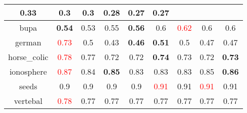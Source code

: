 \documentclass{article}%
\begin{document}
\begin{tabular}{c|cccccccc}
{0.33
}&0.3&\textbf{0.3}&0.28&0.27&0.27\\%
\hline%
bupa&\textbf{0.54}&0.53&0.55&\textbf{0.56}&0.6&\textcolor{red}{ 
0.62
}&0.6&0.6\\%
\hline%
german&\textcolor{red}{ 
0.73
}&0.5&0.43&\textbf{0.46}&\textbf{0.51}&0.5&0.47&0.47\\%
\hline%
horse\_colic&\textcolor{red}{ 
0.78
}&0.77&0.72&0.72&\textbf{0.74}&0.73&0.72&\textbf{0.73}\\%
\hline%
ionosphere&\textcolor{red}{ 
0.87
}&0.84&\textbf{0.85}&0.83&0.83&0.83&0.85&\textbf{0.86}\\%
\hline%
seeds&0.9&0.9&0.9&0.9&\textcolor{red}{ 
0.91
}&0.91&\textcolor{red}{ 
0.91
}&0.91\\%
\hline%
vertebal&\textcolor{red}{ 
0.78
}&0.77&0.77&0.77&0.77&0.77&0.77&0.77\\%
\hline%
\end{tabular}

%
\end{document}
